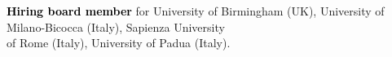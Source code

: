 

\vspace{0.2cm}
\textbf{\textcolor{black}{Hiring board member}} for University of Birmingham (UK), University of Milano-Bicocca (Italy), Sapienza University \\ \phantom{xx} of Rome (Italy), University of Padua (Italy). 


